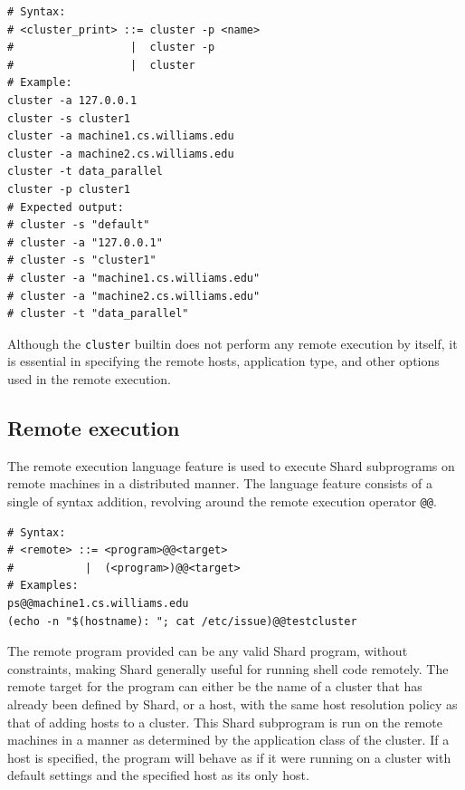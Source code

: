 \documentclass[twoside]{report}
\begin{document}
\begin{minipage}[c]{\textwidth-15pt}
  \begin{lstlisting}[language=Shard]
# Syntax:
# <cluster_print> ::= cluster -p <name>
#                  |  cluster -p
#                  |  cluster
# Example:
cluster -a 127.0.0.1
cluster -s cluster1
cluster -a machine1.cs.williams.edu
cluster -a machine2.cs.williams.edu
cluster -t data_parallel
cluster -p cluster1
# Expected output:
# cluster -s "default"
# cluster -a "127.0.0.1"
# cluster -s "cluster1"
# cluster -a "machine1.cs.williams.edu"
# cluster -a "machine2.cs.williams.edu"
# cluster -t "data_parallel"
\end{lstlisting}
  \smallskip
\end{minipage}

Although the \texttt{cluster} builtin does not perform any remote execution by itself, it is essential in specifying the remote hosts, application type, and other options used in the remote execution.

\subsection{Remote execution}
The remote execution language feature is used to execute Shard subprograms on remote machines in a distributed manner.
The language feature consists of a single of syntax addition, revolving around the remote execution operator \texttt{@@}.

\begin{minipage}[c]{\textwidth-15pt}
  \begin{lstlisting}[language=Shard]
# Syntax:
# <remote> ::= <program>@@<target>
#           |  (<program>)@@<target>
# Examples:
ps@@machine1.cs.williams.edu
(echo -n "$(hostname): "; cat /etc/issue)@@testcluster
\end{lstlisting}
  \smallskip
\end{minipage}

The remote program provided can be any valid Shard program, without constraints, making Shard generally useful for running shell code remotely.
The remote target for the program can either be the name of a cluster that has already been defined by Shard, or a host, with the same host resolution policy as that of adding hosts to a cluster.
This Shard subprogram is run on the remote machines in a manner as determined by the application class of the cluster.
If a host is specified, the program will behave as if it were running on a cluster with default settings and the specified host as its only host.
\end{document}
